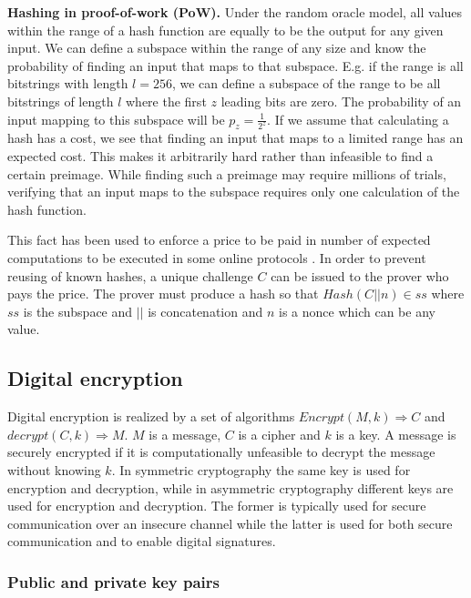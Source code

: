 {\bf Hashing in proof-of-work (PoW).}
Under the random oracle model, all values within the range of a hash function are equally to be the output for any given input. We can define a subspace within the range of any size and know the probability of finding an input that maps to that subspace. E.g. if the range is all bitstrings with length $l=256$, we can define a subspace of the range to be all bitstrings of length $l$ where the first $z$ leading bits are zero. The probability of an input mapping to this subspace will be $p_z=\frac{1}{2^z}$. If we assume that calculating a hash has a cost, we see that finding an input that maps to a limited range has an expected cost. This makes it arbitrarily hard rather than infeasible to find a certain preimage. While finding such a preimage may require millions of trials, verifying that an input maps to the subspace requires only one calculation of the hash function.  

This fact has been used to enforce a price to be paid in number of expected computations to be executed in some online protocols \cite{dwork_pricing_1993} \cite{back_hashcash-denial_2002}. In order to prevent reusing of known hashes, a unique challenge $C$ can be issued to the prover who pays the price. The prover must produce a hash so that $Hash(C || n) \in ss$ where $ss$ is the subspace and $||$ is concatenation and $n$ is a nonce which can be any value. 


\subsection{Digital encryption}

Digital encryption is realized by a set of algorithms $Encrypt(M, k) \Rightarrow C$ and $decrypt(C, k) \Rightarrow M$. $M$ is a message, $C$ is a cipher and $k$ is a key. A message is securely encrypted if it is computationally unfeasible to decrypt the message without knowing $k$. In symmetric cryptography the same key is used for encryption and decryption, while in asymmetric cryptography different keys are used for encryption and decryption. The former is typically used for secure communication over an insecure channel while the latter is used for both secure communication and to enable digital signatures.

\subsubsection{Public and private key pairs}


